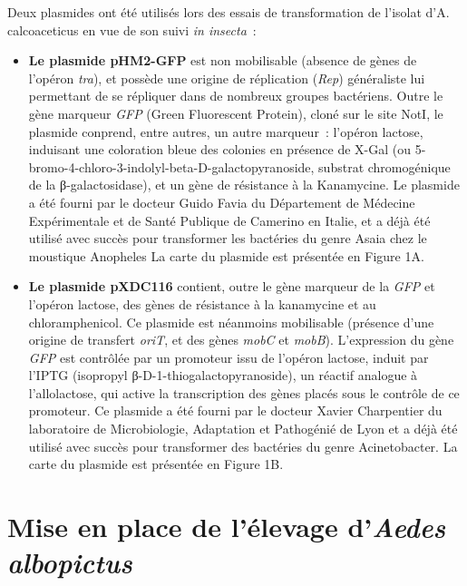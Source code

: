 Deux plasmides ont été utilisés lors des essais de transformation de l’isolat d’A. calcoaceticus en vue de son suivi \textit{in insecta}~:
\begin{itemize}
\item \textbf{Le plasmide pHM2-GFP} est non mobilisable (absence de gènes de l'opéron \textit{tra}), et possède une origine de réplication (\textit{Rep}) généraliste lui permettant de se répliquer dans de nombreux groupes bactériens.
Outre le gène marqueur \textit{GFP} (Green Fluorescent Protein), cloné sur le site NotI, le plasmide conprend, entre autres, un autre marqueur~: l'opéron lactose, induisant une coloration bleue des colonies en présence de X-Gal (ou 5-bromo-4-chloro-3-indolyl-beta-D-galactopyranoside, substrat chromogénique de la β-galactosidase), et un gène de résistance à la Kanamycine.
Le plasmide a été fourni par le docteur Guido Favia du Département de Médecine Expérimentale et de Santé Publique de Camerino en Italie, et a déjà été utilisé avec succès pour transformer les bactéries du genre Asaia chez le moustique Anopheles \cite{favia2007}
La carte du plasmide est présentée en Figure 1A.

\item \textbf{Le plasmide pXDC116} contient, outre le gène marqueur de la \textit{GFP} et l'opéron lactose, des gènes de résistance à la kanamycine et au chloramphenicol. Ce plasmide est néanmoins mobilisable (présence d'une origine de transfert \textit{oriT}, et des gènes \textit{mobC} et \textit{mobB}).
L'expression du gène \textit{GFP} est contrôlée par un promoteur issu de l'opéron lactose, induit par l'IPTG (isopropyl β-D-1-thiogalactopyranoside), un réactif analogue à l'allolactose, qui active la transcription des gènes placés sous le contrôle de ce promoteur.
Ce plasmide a été fourni par le docteur Xavier Charpentier du laboratoire de Microbiologie, Adaptation et Pathogénié de Lyon et a déjà été utilisé avec succès pour transformer des bactéries du genre Acinetobacter. La carte du plasmide est présentée en Figure 1B.

\end{itemize}


\section{Mise en place de l'élevage d'\textit{Aedes albopictus}}

